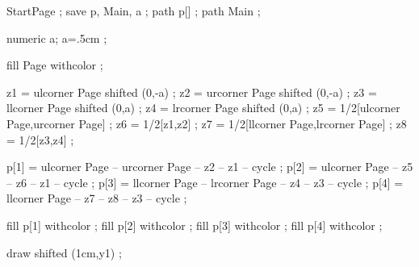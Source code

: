 



\unexpanded{}

\unexpanded{}


StartPage ;
save p, Main, a ;
path p[] ; path Main ;

numeric a; a=.5cm ;

fill Page withcolor  ;

z1 = ulcorner Page shifted (0,-a) ;
z2 = urcorner Page shifted (0,-a) ;
z3 = llcorner Page shifted (0,a) ;
z4 = lrcorner Page shifted (0,a) ;
z5 = 1/2[ulcorner Page,urcorner Page] ;
z6 = 1/2[z1,z2] ;
z7 = 1/2[llcorner Page,lrcorner Page] ;
z8 = 1/2[z3,z4] ;

p[1] = ulcorner Page -- urcorner Page -- z2 -- z1 -- cycle ;
p[2] = ulcorner Page -- z5 -- z6 -- z1 -- cycle ;
p[3] = llcorner Page -- lrcorner Page -- z4 -- z3 -- cycle ;
p[4] = llcorner Page -- z7 -- z8 -- z3 -- cycle ;

fill p[1] withcolor  ;
fill p[2] withcolor  ;
fill p[3] withcolor  ;
fill p[4] withcolor  ;

draw 
     shifted (1cm,y1) ;


